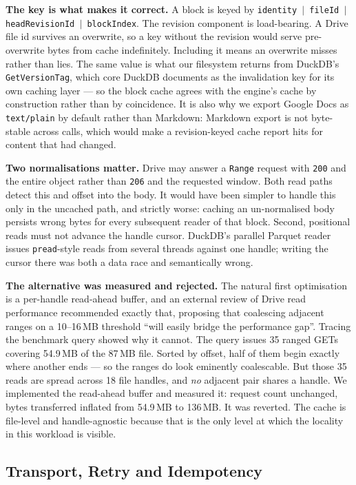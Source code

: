 \documentclass[sigconf, nonacm]{acmart}
\begin{document}
\textbf{The key is what makes it correct.}
A block is keyed by
\texttt{identity\,$\vert$\,fileId\,$\vert$\,headRevisionId\,$\vert$\,blockIndex}.
The revision component is load-bearing. A Drive file id survives an overwrite,
so a key without the revision would serve pre-overwrite bytes from cache
indefinitely. Including it means an overwrite misses rather than lies. The
same value is what our filesystem returns from DuckDB's \texttt{GetVersionTag},
which core DuckDB documents as the invalidation key for its own caching layer
--- so the block cache agrees with the engine's cache by construction rather
than by coincidence. It is also why we export Google Docs as
\texttt{text/plain} by default rather than Markdown: Markdown export is not
byte-stable across calls, which would make a revision-keyed cache report hits
for content that had changed.

\textbf{Two normalisations matter.}
Drive may answer a \texttt{Range} request with \texttt{200} and the entire
object rather than \texttt{206} and the requested window. Both read paths
detect this and offset into the body. It would have been simpler to handle
this only in the uncached path, and strictly worse: caching an un-normalised
body persists wrong bytes for every subsequent reader of that block. Second,
positional reads must not advance the handle cursor. DuckDB's parallel Parquet
reader issues \texttt{pread}-style reads from several threads against one
handle; writing the cursor there was both a data race and semantically wrong.

\textbf{The alternative was measured and rejected.}
The natural first optimisation is a per-handle read-ahead buffer, and an
external review of Drive read performance recommended exactly that, proposing
that coalescing adjacent ranges on a 10--16\,MB threshold ``will easily bridge
the performance gap''. Tracing the benchmark query showed why it cannot. The
query issues 35 ranged GETs covering 54.9\,MB of the 87\,MB file. Sorted by
offset, half of them begin exactly where another ends --- so the ranges do
look eminently coalescable. But those 35 reads are spread across 18 file
handles, and \emph{no} adjacent pair shares a handle. We implemented the
read-ahead buffer and measured it: request count unchanged, bytes transferred
inflated from 54.9\,MB to 136\,MB. It was reverted. The cache is file-level and
handle-agnostic because that is the only level at which the locality in this
workload is visible.

\subsection{Transport, Retry and Idempotency}
\label{sec:transport}
\end{document}
